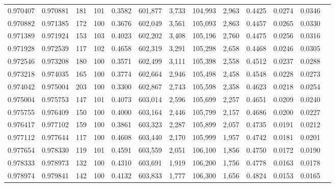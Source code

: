 \begin{tabular}{rrrrrrrrrrrrr}
0.970407 & 0.970881 &   181 & 101 &                                     0.3582 & 601,877 &   3,733 & 104,993 &   2,963 & 0.4425 & 0.0274 & 0.0346 \\
0.970882 & 0.971385 &   172 & 100 &                                     0.3676 & 602,049 &   3,561 & 105,093 &   2,863 & 0.4457 & 0.0265 & 0.0330 \\
0.971389 & 0.971924 &   153 & 103 &                                     0.4023 & 602,202 &   3,408 & 105,196 &   2,760 & 0.4475 & 0.0256 & 0.0316 \\
0.971928 & 0.972539 &   117 & 102 &                                     0.4658 & 602,319 &   3,291 & 105,298 &   2,658 & 0.4468 & 0.0246 & 0.0305 \\
0.972546 & 0.973208 &   180 & 100 &                                     0.3571 & 602,499 &   3,111 & 105,398 &   2,558 & 0.4512 & 0.0237 & 0.0288 \\
0.973218 & 0.974035 &   165 & 100 &                                     0.3774 & 602,664 &   2,946 & 105,498 &   2,458 & 0.4548 & 0.0228 & 0.0273 \\
0.974042 & 0.975004 &   203 & 100 &                                     0.3300 & 602,867 &   2,743 & 105,598 &   2,358 & 0.4623 & 0.0218 & 0.0254 \\
0.975004 & 0.975753 &   147 & 101 &                                     0.4073 & 603,014 &   2,596 & 105,699 &   2,257 & 0.4651 & 0.0209 & 0.0240 \\
0.975755 & 0.976409 &   150 & 100 &                                     0.4000 & 603,164 &   2,446 & 105,799 &   2,157 & 0.4686 & 0.0200 & 0.0227 \\
0.976417 & 0.977102 &   159 & 100 &                                     0.3861 & 603,323 &   2,287 & 105,899 &   2,057 & 0.4735 & 0.0191 & 0.0212 \\
0.977112 & 0.977644 &   117 & 100 &                                     0.4608 & 603,440 &   2,170 & 105,999 &   1,957 & 0.4742 & 0.0181 & 0.0201 \\
0.977654 & 0.978330 &   119 & 101 &                                     0.4591 & 603,559 &   2,051 & 106,100 &   1,856 & 0.4750 & 0.0172 & 0.0190 \\
0.978333 & 0.978973 &   132 & 100 &                                     0.4310 & 603,691 &   1,919 & 106,200 &   1,756 & 0.4778 & 0.0163 & 0.0178 \\
0.978974 & 0.979841 &   142 & 100 &                                     0.4132 & 603,833 &   1,777 & 106,300 &   1,656 & 0.4824 & 0.0153 & 0.0165 \\

\end{tabular}
